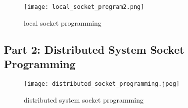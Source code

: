 \documentclass{article}
\begin{document}
\begin{figure}[H]
    \centering
    \texttt{[image: local\_socket\_program2.png]}
    \caption{local socket programming}
    \label{fig:SP}
\end{figure}
\subsection*{Part 2: Distributed System Socket Programming}

\begin{figure}[H]
    \centering
    \texttt{[image: distributed\_socket\_programming.jpeg]}
    \caption{distributed system socket programming}
    \label{fig:SP}
\end{figure}
\end{document}
